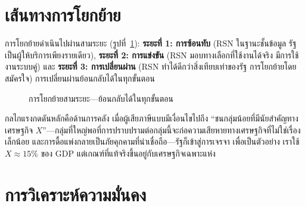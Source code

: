 \documentclass[11pt,a4paper,twocolumn]{article}
\begin{document}
\section{เส้นทางการโยกย้าย}

การโยกย้ายดำเนินไปผ่านสามระยะ (รูปที่~\ref{fig:migration}): \textbf{ระยะที่ 1: การซ้อนทับ} (RSN ในฐานะชั้นข้อมูล รัฐเป็นผู้ให้บริการเพียงรายเดียว), \textbf{ระยะที่ 2: การแข่งขัน} (RSN มอบทางเลือกที่ใช้งานได้จริง มีการใช้งานระบบคู่) และ \textbf{ระยะที่ 3: การเปลี่ยนผ่าน} (RSN ทำได้ดีกว่าสิ่งเทียบเท่าของรัฐ การโยกย้ายโดยสมัครใจ) การเปลี่ยนผ่านย้อนกลับได้ในทุกขั้นตอน

\begin{figure}[ht]
\centering
{}
\caption{การโยกย้ายสามระยะ---ย้อนกลับได้ในทุกขั้นตอน}
\label{fig:migration}
\end{figure}

กลไกแรงกดดันหลักคือด้านการคลัง เมื่อผู้เสียภาษีแบบมีเงื่อนไขไปถึง ``ชนกลุ่มน้อยที่มีนัยสำคัญทางเศรษฐกิจ $X$''---กลุ่มที่ใหญ่พอที่การปราบปรามต่อกลุ่มนี้จะก่อความเสียหายทางเศรษฐกิจที่ไม่ใช่เรื่องเล็กน้อย และการดื้อแพ่งกลายเป็นภัยคุกคามที่น่าเชื่อถือ---รัฐก็เข้าสู่การเจรจา เพื่อเป็นตัวอย่าง เราใช้ $X \approx 15\%$ ของ GDP แต่เกณฑ์ที่แท้จริงขึ้นอยู่กับเศรษฐกิจเฉพาะแห่ง

\section{การวิเคราะห์ความมั่นคง}
\end{document}
